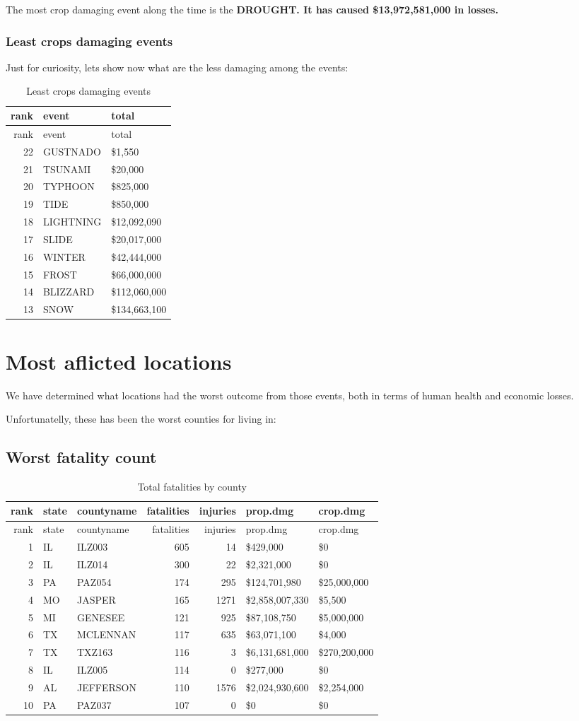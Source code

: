 \documentclass[]{article}
\begin{document}
The most crop damaging event along the time is the \textbf{DROUGHT. It
has caused \$13,972,581,000 in losses.}

\subsubsection{Least crops damaging
events}\label{least-crops-damaging-events}

Just for curiosity, lets show now what are the less damaging among the
events:

\begin{longtable}[]{@{}rll@{}}
\caption{Least crops damaging events}\tabularnewline
\toprule
rank & event & total\tabularnewline
\midrule
\endfirsthead
\toprule
rank & event & total\tabularnewline
\midrule
\endhead
22 & GUSTNADO & \$1,550\tabularnewline
21 & TSUNAMI & \$20,000\tabularnewline
20 & TYPHOON & \$825,000\tabularnewline
19 & TIDE & \$850,000\tabularnewline
18 & LIGHTNING & \$12,092,090\tabularnewline
17 & SLIDE & \$20,017,000\tabularnewline
16 & WINTER & \$42,444,000\tabularnewline
15 & FROST & \$66,000,000\tabularnewline
14 & BLIZZARD & \$112,060,000\tabularnewline
13 & SNOW & \$134,663,100\tabularnewline
\bottomrule
\end{longtable}

\section{Most aflicted locations}\label{most-aflicted-locations}

We have determined what locations had the worst outcome from those
events, both in terms of human health and economic losses.

Unfortunatelly, these has been the worst counties for living in:

\subsection{Worst fatality count}\label{worst-fatality-count}

\begin{longtable}[]{@{}rllrrll@{}}
\caption{Total fatalities by county}\tabularnewline
\toprule
rank & state & countyname & fatalities & injuries & prop.dmg &
crop.dmg\tabularnewline
\midrule
\endfirsthead
\toprule
rank & state & countyname & fatalities & injuries & prop.dmg &
crop.dmg\tabularnewline
\midrule
\endhead
1 & IL & ILZ003 & 605 & 14 & \$429,000 & \$0\tabularnewline
2 & IL & ILZ014 & 300 & 22 & \$2,321,000 & \$0\tabularnewline
3 & PA & PAZ054 & 174 & 295 & \$124,701,980 &
\$25,000,000\tabularnewline
4 & MO & JASPER & 165 & 1271 & \$2,858,007,330 & \$5,500\tabularnewline
5 & MI & GENESEE & 121 & 925 & \$87,108,750 & \$5,000,000\tabularnewline
6 & TX & MCLENNAN & 117 & 635 & \$63,071,100 & \$4,000\tabularnewline
7 & TX & TXZ163 & 116 & 3 & \$6,131,681,000 &
\$270,200,000\tabularnewline
8 & IL & ILZ005 & 114 & 0 & \$277,000 & \$0\tabularnewline
9 & AL & JEFFERSON & 110 & 1576 & \$2,024,930,600 &
\$2,254,000\tabularnewline
10 & PA & PAZ037 & 107 & 0 & \$0 & \$0\tabularnewline
\bottomrule
\end{longtable}
\end{document}
